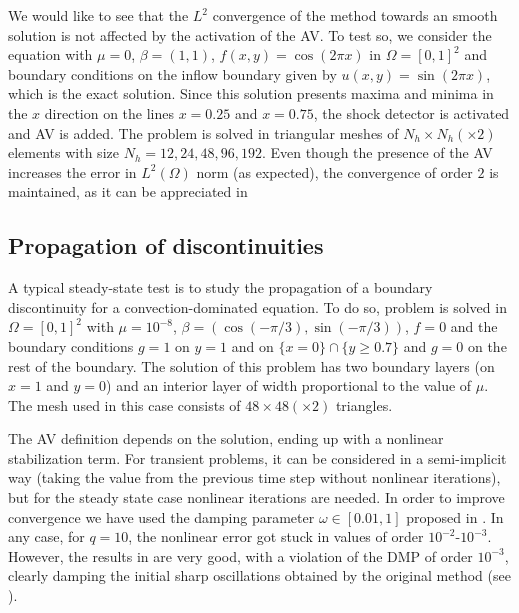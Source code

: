 We would like to see that the $L^2$ convergence of the method towards an smooth solution is not affected by the activation of the AV. To test so, we consider the equation  with $\mu=0$, $\beta=(1,1)$, $f(x,y)=\cos(2\pi x)$  in $\Omega=[0,1]^2$ and boundary conditions on the inflow boundary given by $u(x,y) = \sin(2\pi x)$, which is the exact solution. Since this solution presents maxima and minima in the $x$ direction on the lines $x=0.25$ and $x=0.75$, the shock detector is activated and AV is added. The problem is solved in triangular meshes of $N_h\times N_h (\times 2)$ elements with size $N_h = 12, 24, 48, 96, 192$. Even though the presence of the AV increases the error in $L^2(\Omega)$ norm (as expected), the convergence of order $2$ is maintained, as it can be appreciated in 


\subsection{Propagation of discontinuities}

A typical steady-state test is to study the propagation of a boundary discontinuity for a convection-dominated equation. To do so, problem  is solved in $\Omega = [0,1]^2$ with $\mu = 10^{-8}$, $\beta =  (\cos(-\pi/3),\sin(-\pi/3))$, $f=0$ and the boundary conditions $g = 1$ on $y=1$ and on $\{x=0\}\cap\{y\geq 0.7\}$ and $g=0$ on the rest of the boundary. The solution of this problem has two boundary layers (on $x=1$ and $y=0$) and an interior layer of width proportional to the value of $\mu$. The mesh used in this case consists of $48\times48(\times 2)$ triangles. 


The AV definition depends on the solution, ending up with a nonlinear stabilization term. For transient problems, it can be considered in a semi-implicit way (taking the value from the previous time step without nonlinear iterations), but for the steady state case nonlinear iterations are needed. In order to improve convergence we have used the damping parameter $\omega\in[0.01,1]$ proposed in \cite{John20081997}. In any case, for $q=10$, the nonlinear error got stuck in values of order $10^{-2}$-$10^{-3}$.  However, the results in  are very good, with a violation of the DMP of order $10^{-3}$, clearly damping the initial sharp oscillations obtained by the original method (see ). 

